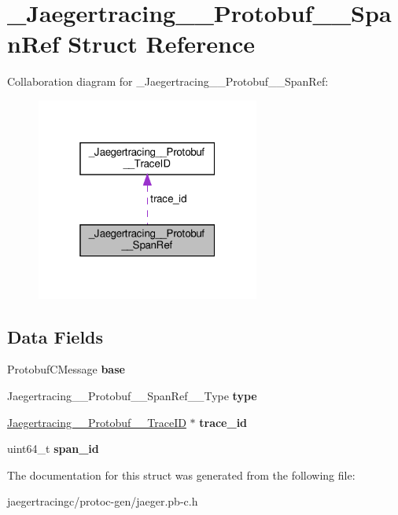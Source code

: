 \hypertarget{struct__Jaegertracing____Protobuf____SpanRef}{}\section{\+\_\+\+Jaegertracing\+\_\+\+\_\+\+Protobuf\+\_\+\+\_\+\+Span\+Ref Struct Reference}
\label{struct__Jaegertracing____Protobuf____SpanRef}


Collaboration diagram for \+\_\+\+Jaegertracing\+\_\+\+\_\+\+Protobuf\+\_\+\+\_\+\+Span\+Ref\+:
\nopagebreak
\begin{figure}[H]
\begin{center}
\leavevmode
\includegraphics[width=208pt]{struct__Jaegertracing____Protobuf____SpanRef__coll__graph}
\end{center}
\end{figure}
\subsection*{Data Fields}
\begin{DoxyCompactItemize}
\item 
\mbox{\label{struct__Jaegertracing____Protobuf____SpanRef_a8034208957bece0b408cea9cd6015b98}} 
Protobuf\+C\+Message {\bfseries base}
\item 
\mbox{\label{struct__Jaegertracing____Protobuf____SpanRef_acf330d0ea738d0fac8cd3038ad1b8261}} 
Jaegertracing\+\_\+\+\_\+\+Protobuf\+\_\+\+\_\+\+Span\+Ref\+\_\+\+\_\+\+Type {\bfseries type}
\item 
\mbox{\label{struct__Jaegertracing____Protobuf____SpanRef_aaa4464a336d9d2c6c0197264dfa22314}} 
\mbox{\hyperlink{struct__Jaegertracing____Protobuf____TraceID}{Jaegertracing\+\_\+\+\_\+\+Protobuf\+\_\+\+\_\+\+Trace\+ID}} $\ast$ {\bfseries trace\+\_\+id}
\item 
\mbox{\label{struct__Jaegertracing____Protobuf____SpanRef_a639ed6c4e8ce8ebc0f711367bd7603cf}} 
uint64\+\_\+t {\bfseries span\+\_\+id}
\end{DoxyCompactItemize}


The documentation for this struct was generated from the following file\+:\begin{DoxyCompactItemize}
\item 
jaegertracingc/protoc-\/gen/jaeger.\+pb-\/c.\+h\end{DoxyCompactItemize}
